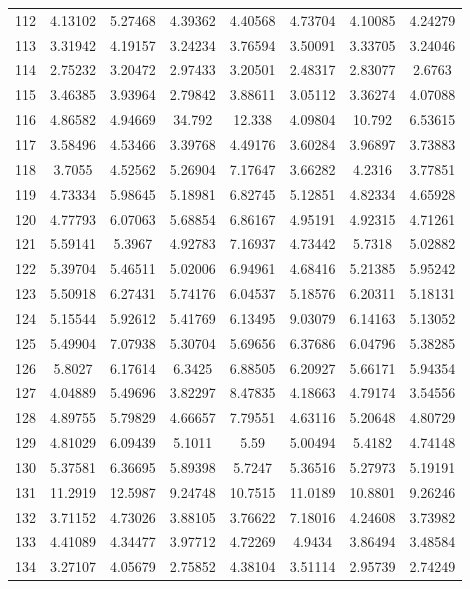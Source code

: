 \begin{figure}
\begin{tabular}{cccccccc}
112 & 4.13102 & 5.27468 & 4.39362 & 4.40568 & 4.73704 & 4.10085 & 4.24279\\
113 & 3.31942 & 4.19157 & 3.24234 & 3.76594 & 3.50091 & 3.33705 & 3.24046\\
114 & 2.75232 & 3.20472 & 2.97433 & 3.20501 & 2.48317 & 2.83077 & 2.6763\\
115 & 3.46385 & 3.93964 & 2.79842 & 3.88611 & 3.05112 & 3.36274 & 4.07088\\
116 & 4.86582 & 4.94669 & 34.792 & 12.338 & 4.09804 & 10.792 & 6.53615\\
117 & 3.58496 & 4.53466 & 3.39768 & 4.49176 & 3.60284 & 3.96897 & 3.73883\\
118 & 3.7055 & 4.52562 & 5.26904 & 7.17647 & 3.66282 & 4.2316 & 3.77851\\
119 & 4.73334 & 5.98645 & 5.18981 & 6.82745 & 5.12851 & 4.82334 & 4.65928\\
120 & 4.77793 & 6.07063 & 5.68854 & 6.86167 & 4.95191 & 4.92315 & 4.71261\\
121 & 5.59141 & 5.3967 & 4.92783 & 7.16937 & 4.73442 & 5.7318 & 5.02882\\
122 & 5.39704 & 5.46511 & 5.02006 & 6.94961 & 4.68416 & 5.21385 & 5.95242\\
123 & 5.50918 & 6.27431 & 5.74176 & 6.04537 & 5.18576 & 6.20311 & 5.18131\\
124 & 5.15544 & 5.92612 & 5.41769 & 6.13495 & 9.03079 & 6.14163 & 5.13052\\
125 & 5.49904 & 7.07938 & 5.30704 & 5.69656 & 6.37686 & 6.04796 & 5.38285\\
126 & 5.8027 & 6.17614 & 6.3425 & 6.88505 & 6.20927 & 5.66171 & 5.94354\\
127 & 4.04889 & 5.49696 & 3.82297 & 8.47835 & 4.18663 & 4.79174 & 3.54556\\
128 & 4.89755 & 5.79829 & 4.66657 & 7.79551 & 4.63116 & 5.20648 & 4.80729\\
129 & 4.81029 & 6.09439 & 5.1011 & 5.59 & 5.00494 & 5.4182 & 4.74148\\
130 & 5.37581 & 6.36695 & 5.89398 & 5.7247 & 5.36516 & 5.27973 & 5.19191\\
131 & 11.2919 & 12.5987 & 9.24748 & 10.7515 & 11.0189 & 10.8801 & 9.26246\\
132 & 3.71152 & 4.73026 & 3.88105 & 3.76622 & 7.18016 & 4.24608 & 3.73982\\
133 & 4.41089 & 4.34477 & 3.97712 & 4.72269 & 4.9434 & 3.86494 & 3.48584\\
134 & 3.27107 & 4.05679 & 2.75852 & 4.38104 & 3.51114 & 2.95739 & 2.74249\\

\end{tabular}
\end{figure}
